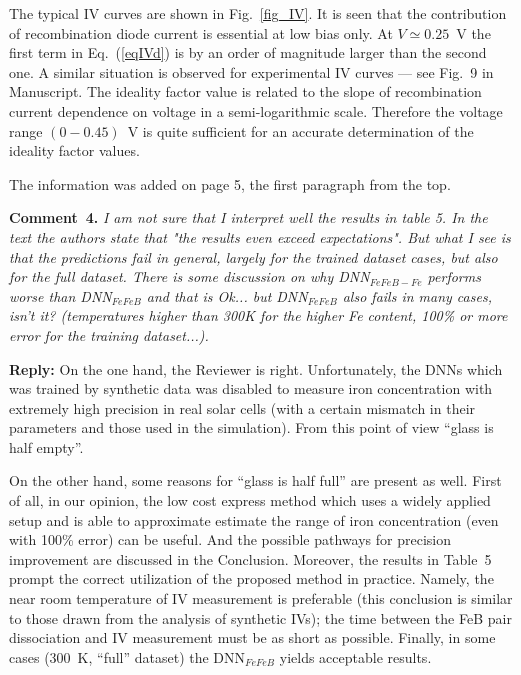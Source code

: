 \documentclass[num-refs]{wiley-article} %
\begin{document}
The typical IV curves are shown in Fig.~\ref{fig_IV}.
It is seen that the contribution of recombination diode current is essential at low bias only.
At $V\simeq 0.25$~V the first term in Eq.~(\ref{eqIVd}) is
by an order of magnitude larger than the second one.
A similar situation is observed for
experimental IV curves --- see Fig.~9 in Manuscript.
The ideality factor value is related to the slope of recombination current
dependence on voltage in a semi-logarithmic scale.
Therefore the voltage range $(0-0.45)$~V is quite sufficient for an accurate determination of the ideality factor values.



The information was added on page 5, the first paragraph from the top.


\vspace{1cm}
\noindent
\textcolor[rgb]{0.00,0.50,1.00}{\textbf{Comment~4.}}
\emph{I am not sure that I interpret well the results in table 5.
In the text the authors state that "the results even exceed expectations".
But what I see is that the predictions fail in general, largely for the trained dataset cases,
but also for the full dataset.
There is some discussion on why DNN$_{FeFeB-Fe}$ performs worse than DNN$_{FeFeB}$
and that is Ok... but DNN$_{FeFeB}$ also fails in many cases, isn't it?
(temperatures higher than 300K for the higher Fe content,
100\% or more error for the training dataset...).
}

\vspace{0.5cm}
\noindent
\textcolor[rgb]{0.51,0.00,0.00}{\textbf{Reply:}}
On the one hand, the Reviewer is right.
Unfortunately, the DNNs which was trained by synthetic data
was disabled to measure iron concentration
with extremely high precision in real solar cells
(with a certain mismatch in their parameters and those used in the simulation).
From this point of view ``glass is half empty''.

On the other hand, some reasons for ``glass is half full''
are present as well.
First of all, in our opinion, the
low cost express method which uses a widely applied
setup and is able to approximate estimate the range of iron concentration
(even with 100\% error) can be useful.
And the possible pathways for precision improvement are discussed in the Conclusion.
Moreover, the results in Table~5 prompt the correct utilization of the proposed method in practice.
Namely, the near room temperature of IV measurement is preferable
(this conclusion is similar to those drawn from the analysis of synthetic IVs);
the time between the FeB pair dissociation and IV measurement must be as short as possible.
Finally, in some cases (300~K, ``full'' dataset) the DNN$_{FeFeB}$ yields acceptable results.
\end{document}
